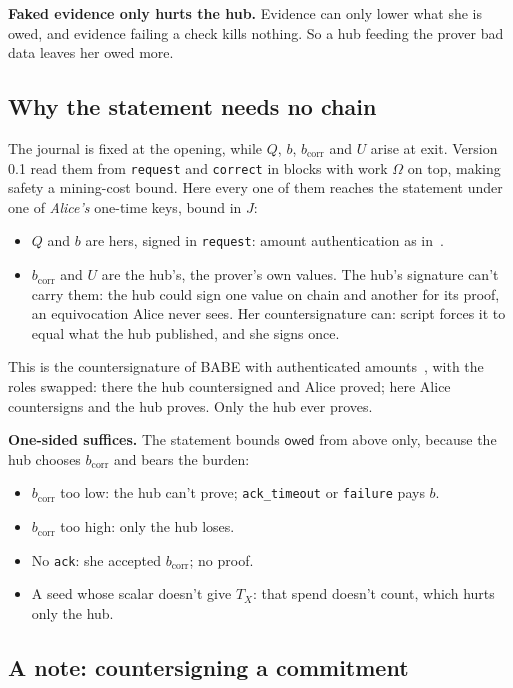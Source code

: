 \documentclass[11pt]{article}
\theoremstyle{plain}
\theoremstyle{definition}
\newcommand{\bcorr}{b_{\mathrm{corr}}}
\newcommand{\tx}[1]{\texttt{#1}}
\newcommand{\owed}{\mathsf{owed}}
\begin{document}
\textbf{Faked evidence only hurts the hub.} Evidence can only lower what
she is owed, and evidence failing a check kills nothing. So a hub
feeding the prover bad data leaves her owed more.

\subsection{Why the statement needs no chain}\label{sec:nochain}

The journal is fixed at the opening, while $Q$, $b$, $\bcorr$ and $U$
arise at exit. Version 0.1 read them from \tx{request} and \tx{correct}
in blocks with work $\Omega$ on top, making safety a mining-cost bound.
Here every one of them reaches the statement under one of \emph{Alice's}
one-time keys, bound in $J$:
\begin{itemize}[nosep]
\item $Q$ and $b$ are hers, signed in \tx{request}: amount
  authentication as in~\cite{lichen}.
\item $\bcorr$ and $U$ are the hub's, the prover's own values. The
  hub's signature can't carry them: the hub could sign one value on
  chain and another for its proof, an equivocation Alice never sees.
  Her countersignature can: script forces it to equal what the hub
  published, and she signs once.
\end{itemize}
This is the countersignature of BABE with authenticated
amounts~\cite{lichen,delving}, with the roles swapped: there the hub
countersigned and Alice proved; here Alice countersigns and the hub
proves. Only the hub ever proves.

\textbf{One-sided suffices.} The statement bounds $\owed$ from above
only, because the hub chooses $\bcorr$ and bears the burden:
\begin{itemize}[nosep]
\item $\bcorr$ too low: the hub can't prove; \tx{ack\_timeout} or
  \tx{failure} pays $b$.
\item $\bcorr$ too high: only the hub loses.
\item No \tx{ack}: she accepted $\bcorr$; no proof.
\item A seed whose scalar doesn't give $T_X$: that spend doesn't count,
  which hurts only the hub.
\end{itemize}

\subsection{A note: countersigning a commitment}\label{sec:commit}
\end{document}
